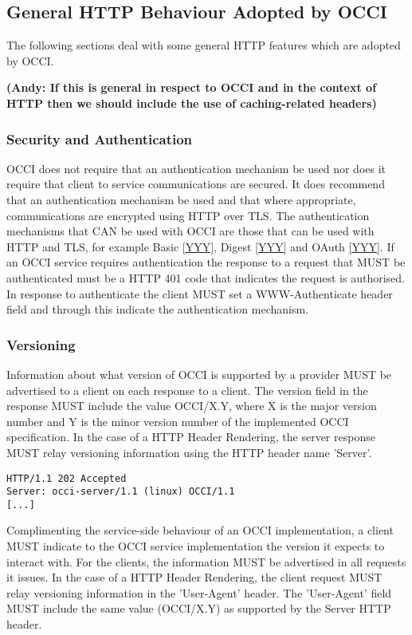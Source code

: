 \documentclass[10pt,a4paper]{article}
\begin{document}
\subsection{General HTTP Behaviour Adopted by OCCI}
The following sections deal with some general HTTP features which are
adopted by OCCI.

\textbf{(Andy: If this is general in respect to OCCI and in the context of HTTP then
we should include the use of caching-related headers)}

\subsubsection{Security and Authentication}
OCCI does not require that an authentication mechanism be used nor
does it require that client to service communications are secured. It
does recommend that an authentication mechanism be used and that where
appropriate, communications are encrypted using HTTP over TLS. The
authentication mechanisms that CAN be used with OCCI are those that
can be used with HTTP and TLS, for example Basic \ref{YYY}, Digest \ref{YYY}
and OAuth \ref{YYY}. If an OCCI service requires authentication the
response to a request that MUST be authenticated must be a HTTP 401
code that indicates the request is authorised. In response to
authenticate the client MUST set a WWW-Authenticate header field and
through this indicate the authentication mechanism.

\subsubsection{Versioning}
Information about what version of OCCI is supported by a provider MUST
be advertised to a client on each response to a client. The version
field in the response MUST include the value OCCI/X.Y, where X is the
major version number and Y is the minor version number of the
implemented OCCI specification. In the case of a HTTP Header
Rendering, the server response MUST relay versioning information
using the HTTP header name 'Server'.

\begin{verbatim}
HTTP/1.1 202 Accepted
Server: occi-server/1.1 (linux) OCCI/1.1
[...]
\end{verbatim}

Complimenting the service-side behaviour of an OCCI implementation, a
client MUST indicate to the OCCI service implementation the version it
expects to interact with. For the clients, the information MUST be
advertised in all requests it issues. In the case of a HTTP Header
Rendering, the client request MUST relay versioning information in
the 'User-Agent' header. The 'User-Agent' field MUST include the same
value (OCCI/X.Y) as supported by the Server HTTP header.
\end{document}
